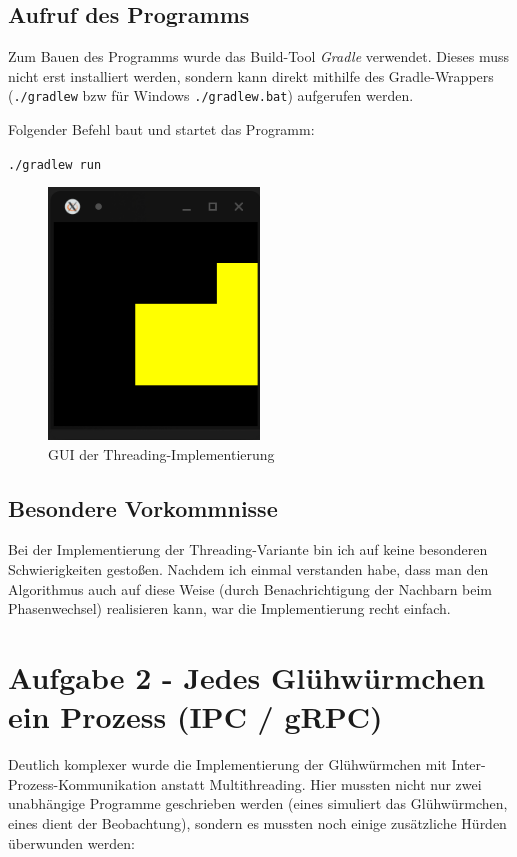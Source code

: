 \documentclass[12pt]{article}
\begin{document}
\subsection*{Aufruf des Programms}
Zum Bauen des Programms wurde das Build-Tool \emph{Gradle} verwendet. Dieses muss nicht erst installiert werden, sondern kann direkt mithilfe des Gradle-Wrappers (\texttt{./gradlew} bzw für Windows \texttt{./gradlew.bat}) aufgerufen werden.

Folgender Befehl baut und startet das Programm:

\texttt{./gradlew run}

\begin{figure}[H]
	\centering
	\includegraphics[width=0.5\textwidth]{./img/screenshot_threading}
	\caption{GUI der Threading-Implementierung}
\end{figure}

\subsection*{Besondere Vorkommnisse}
Bei der Implementierung der Threading-Variante bin ich auf keine besonderen Schwierigkeiten gestoßen. Nachdem ich einmal verstanden habe, dass man den Algorithmus auch auf diese Weise (durch Benachrichtigung der Nachbarn beim Phasenwechsel) realisieren kann, war die Implementierung recht einfach.

\section*{Aufgabe 2 - Jedes Glühwürmchen ein Prozess (IPC / gRPC)}
Deutlich komplexer wurde die Implementierung der Glühwürmchen mit Inter-Prozess-Kommunikation anstatt Multithreading. Hier mussten nicht nur zwei unabhängige Programme geschrieben werden (eines simuliert das Glühwürmchen, eines dient der Beobachtung), sondern es mussten noch einige zusätzliche Hürden überwunden werden:
\end{document}
